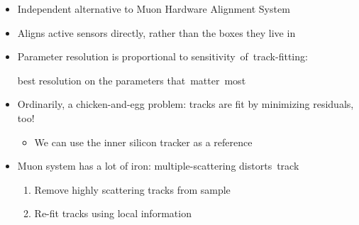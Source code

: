 \documentclass[compress]{beamer}
\begin{document}
\begin{frame}
\vfill
\begin{itemize}
\item Independent alternative to Muon Hardware Alignment System
\item Aligns active sensors directly, rather than the boxes they live in
\item Parameter resolution is proportional to \mbox{sensitivity of track-fitting:\hspace{-1 cm}}

best resolution on the parameters \mbox{that matter most\hspace{-1 cm}}
\end{itemize}

\vfill \hspace{-0.83 cm} 

\begin{itemize}
\item<3-4> Ordinarily, a chicken-and-egg problem: tracks are fit by minimizing residuals, too!
\begin{itemize}
\item We can use the inner silicon tracker as a reference
\end{itemize}
\item<4> Muon system has a lot of iron: multiple-scattering \mbox{distorts track\hspace{-1 cm}}
\begin{enumerate}
\item Remove highly scattering tracks from sample
\item Re-fit tracks using local information
\end{enumerate}
\end{itemize}
\end{frame}

\end{document}
